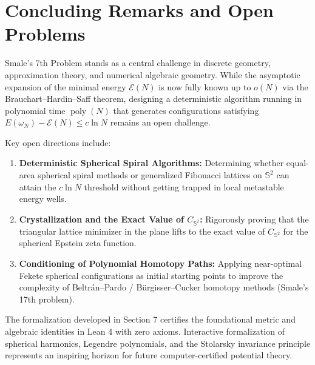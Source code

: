 \documentclass[11pt,a4paper]{article}
\theoremstyle{definition}
\begin{document}
\section{Concluding Remarks and Open Problems}

Smale's 7th Problem stands as a central challenge in discrete geometry, approximation theory, and numerical algebraic geometry. While the asymptotic expansion of the minimal energy $\mathcal{E}(N)$ is now fully known up to $o(N)$ via the Brauchart--Hardin--Saff theorem, designing a deterministic algorithm running in polynomial time $\operatorname{poly}(N)$ that generates configurations satisfying $E(\omega_N) - \mathcal{E}(N) \le c \ln N$ remains an open challenge.

Key open directions include:
\begin{enumerate}
    \item \textbf{Deterministic Spherical Spiral Algorithms:} Determining whether equal-area spherical spiral methods or generalized Fibonacci lattices on $\mathbb{S}^2$ can attain the $c \ln N$ threshold without getting trapped in local metastable energy wells.
    \item \textbf{Crystallization and the Exact Value of $C_{\mathbb{S}^2}$:} Rigorously proving that the triangular lattice minimizer in the plane lifts to the exact value of $C_{\mathbb{S}^2}$ for the spherical Epstein zeta function.
    \item \textbf{Conditioning of Polynomial Homotopy Paths:} Applying near-optimal Fekete spherical configurations as initial starting points to improve the complexity of Beltr{\'a}n--Pardo / Bürgisser--Cucker homotopy methods (Smale's 17th problem).
\end{enumerate}

The formalization developed in Section 7 certifies the foundational metric and algebraic identities in Lean 4 with zero axioms. Interactive formalization of spherical harmonics, Legendre polynomials, and the Stolarsky invariance principle represents an inspiring horizon for future computer-certified potential theory.
\end{document}
